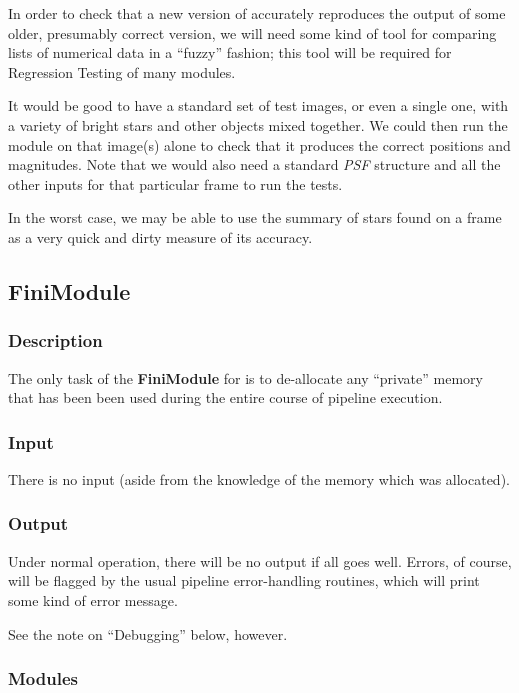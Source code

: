 In order to check that a new version of \fbs accurately reproduces
the output of some older, presumably correct version,
we will need some kind of tool for comparing lists of numerical
data in a ``fuzzy'' fashion; this tool will be required for
Regression Testing of many modules.

It would be good to have a standard set of test
images, or even a single one, with a variety of bright stars
and other objects mixed together.  We could then run the
module on that image(s) alone to check that it produces the
correct positions and magnitudes.  Note that we would also
need a standard {\it PSF} structure and all the other inputs
for that particular frame to run the tests.

In the worst case, we may be able to use the summary of stars
found on a frame as a very quick and dirty measure of its
accuracy.

\subsection {FiniModule}

\subsubsection {Description}

The only task of the {\bf FiniModule} for \fbs is to de-allocate
any ``private'' memory that has been been used during the entire
course of pipeline execution.

\subsubsection {Input}

  There is no input (aside from the knowledge of the memory
which was allocated).

\subsubsection {Output}

  Under normal operation, there will be no output if all goes well.
Errors, of course, will be flagged by the usual pipeline
error-handling routines, which will print some kind of
error message.

  See the note on ``Debugging'' below, however.

\subsubsection {Modules}

